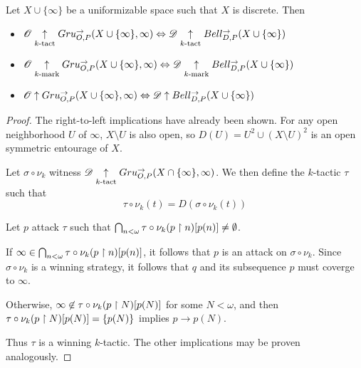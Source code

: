 \begin{thm}
  Let $X\cup\{\infty\}$ be a uniformizable space such that $X$ is discrete. Then
  \begin{itemize}
    \item
      $
        \mathscr{O}\underset{k\text{-tact}}{\uparrow} Gru_{O,P}^{\to}(X\cup\{\infty\},\infty)
          \Leftrightarrow
        \mathscr{D} \underset{k\text{-tact}}{\uparrow} Bell_{D,P}^{\to}(X\cup\{\infty\})
      $
    \item
      $
        \mathscr{O}\underset{k\text{-mark}}{\uparrow} Gru_{O,P}^{\to}(X\cup\{\infty\},\infty)
          \Leftrightarrow
        \mathscr{D} \underset{k\text{-mark}}{\uparrow} Bell_{D,P}^{\to}(X\cup\{\infty\})
      $
    \item
      $
        \mathscr{O}\uparrow Gru_{O,P}^{\to}(X\cup\{\infty\},\infty)
          \Leftrightarrow
        \mathscr{D} \uparrow Bell_{D,P}^{\to}(X\cup\{\infty\})
      $
  \end{itemize}
\end{thm}

\begin{proof}
  The right-to-left implications have already been shown.
  For any open neighborhood $U$ of $\infty$, $X\setminus U$ is also open,
  so $D(U)=U^2\cup(X\setminus U)^2$ is an open symmetric entourage of $X$.

  Let $\sigma\circ\nu_k$ witness
  $\mathscr{D} \underset{k\text{-tact}}{\uparrow}Gru_{O,P}^{\to}(X\cap\{\infty\},\infty)$. We then define
  the $k$-tactic $\tau$ such that
    \[
      \tau\circ\nu_k(t) = D(\sigma\circ\nu_k(t))
    \]

  Let $p$ attack $\tau$ such that
  $\bigcap_{n<\omega}\tau\circ\nu_k(p\restriction n)[p(n)]\not=\emptyset$.

  If $\infty\in\bigcap_{n<\omega}\tau\circ\nu_k(p\restriction n)[p(n)]$, it follows
  that $p$
  is an attack on $\sigma\circ\nu_k$. Since $\sigma\circ\nu_k$ is a winning
  strategy, it follows
  that $q$ and its subsequence $p$ must coverge to $\infty$.

  Otherwise, $\infty\not\in\tau\circ\nu_k(p\restriction N)[p(N)]$ for some $N<\omega$,
  and then
  $\tau\circ\nu_k(p\restriction N)[p(N)]=\{p(N)\}$ implies $p\to p(N)$.

  Thus $\tau$ is a winning $k$-tactic. The other implications may
  be proven analogously.
\end{proof}


